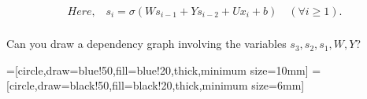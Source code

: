 \documentclass[solution,addpoints,12pt]{exam}
\begin{document}
\begin{questions}
\begin{parts}
            \begin{align*}
              \textit{Here,} \quad s_i = \sigma(Ws_{i-1} + Ys_{i-2} + Ux_i + b) \quad (\forall i \geq 1). \\ 
            \end{align*}

            Can you draw a dependency graph involving the variables $ s_3, s_2, s_1, W, Y$?
                  \begin{solution}
                  		\begin{center}
                    =[circle,draw=blue!50,fill=blue!20,thick,minimum size=10mm]
                    =[circle,draw=black!50,fill=black!20,thick,minimum size=6mm]
                  \end{center}
                  \end{solution}

\end{parts}
\end{questions}
\end{document}
